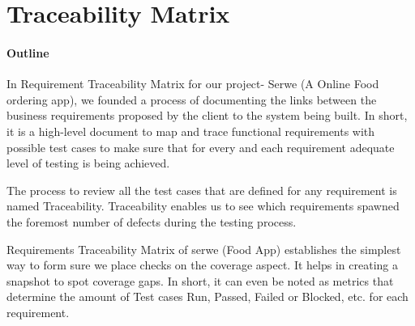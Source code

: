 \documentclass[12pt]{article}
\begin{document}
\section{Traceability Matrix}

\paragraph{Outline}
In Requirement Traceability Matrix for our project- Serwe (A Online Food ordering app), we founded a process of documenting the links between the business requirements proposed by the client to the system being built. In short, it is a high-level document to map and trace functional requirements with possible test cases to make sure that for every and each requirement adequate level of testing is being achieved.

The process to review all the test cases that are defined for any requirement is named Traceability. Traceability enables us to see which requirements spawned the foremost number of defects during the testing process.

Requirements Traceability Matrix of serwe (Food App) establishes the simplest way to form sure we place checks on the coverage aspect. It helps in creating a snapshot to spot coverage gaps. In short, it can even be noted as metrics that determine the amount of Test cases Run, Passed, Failed or Blocked, etc. for each requirement.
\end{document}
